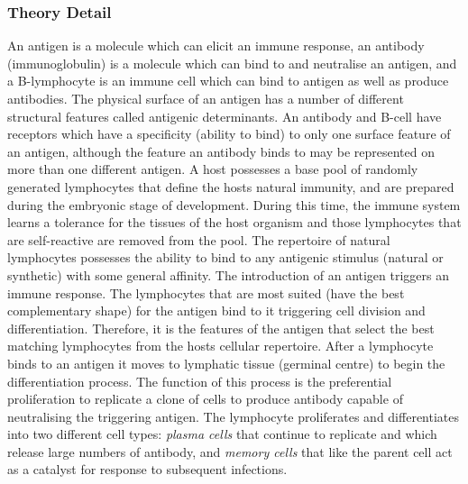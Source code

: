 \subsubsection{Theory Detail}
\label{subsubsec:theory:summary}
An antigen is a molecule which can elicit an immune response, an antibody (immunoglobulin) is a molecule which can bind to and neutralise an antigen, and a B-lymphocyte is an immune cell which can bind to antigen as well as produce antibodies. The physical surface of an antigen has a number of different structural features called antigenic determinants. An antibody and B-cell have receptors which have a specificity (ability to bind) to only one surface feature of an antigen, although the feature an antibody binds to may be represented on more than one different antigen. A host possesses a base pool of randomly generated  lymphocytes that define the hosts natural immunity, and are prepared during the embryonic stage of development. During this time, the immune system learns a tolerance for the tissues of the host organism and those lymphocytes that are self-reactive are removed from the pool. The repertoire of natural lymphocytes possesses the ability to bind to any antigenic stimulus (natural or synthetic) with some general affinity. The introduction of an antigen triggers an immune response. The lymphocytes that are most suited (have the best complementary shape) for the antigen bind to it triggering cell division and differentiation. Therefore, it is the features of the antigen that select the best matching lymphocytes from the hosts cellular repertoire. After a lymphocyte binds to an antigen it moves to lymphatic tissue (germinal centre) to begin the differentiation process. The function of this process is the preferential proliferation to replicate a clone of cells to produce antibody capable of neutralising the triggering antigen. The lymphocyte proliferates and differentiates into two different cell types: \emph{plasma cells} that continue to replicate and which release large numbers of antibody, and \emph{memory cells} that like the parent cell act as a catalyst for response to subsequent infections. 

